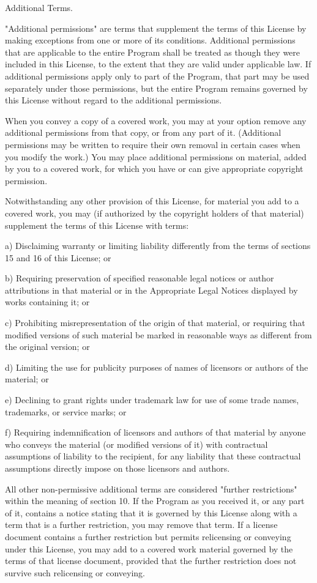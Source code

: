 \begin{DoxyEnumerate}
\item Additional Terms.
\end{DoxyEnumerate}

"{}\+Additional permissions"{} are terms that supplement the terms of this License by making exceptions from one or more of its conditions. Additional permissions that are applicable to the entire Program shall be treated as though they were included in this License, to the extent that they are valid under applicable law. If additional permissions apply only to part of the Program, that part may be used separately under those permissions, but the entire Program remains governed by this License without regard to the additional permissions.

When you convey a copy of a covered work, you may at your option remove any additional permissions from that copy, or from any part of it. (Additional permissions may be written to require their own removal in certain cases when you modify the work.) You may place additional permissions on material, added by you to a covered work, for which you have or can give appropriate copyright permission.

Notwithstanding any other provision of this License, for material you add to a covered work, you may (if authorized by the copyright holders of that material) supplement the terms of this License with terms\+: \begin{DoxyVerb}a) Disclaiming warranty or limiting liability differently from the
terms of sections 15 and 16 of this License; or

b) Requiring preservation of specified reasonable legal notices or
author attributions in that material or in the Appropriate Legal
Notices displayed by works containing it; or

c) Prohibiting misrepresentation of the origin of that material, or
requiring that modified versions of such material be marked in
reasonable ways as different from the original version; or

d) Limiting the use for publicity purposes of names of licensors or
authors of the material; or

e) Declining to grant rights under trademark law for use of some
trade names, trademarks, or service marks; or

f) Requiring indemnification of licensors and authors of that
material by anyone who conveys the material (or modified versions of
it) with contractual assumptions of liability to the recipient, for
any liability that these contractual assumptions directly impose on
those licensors and authors.
\end{DoxyVerb}
 All other non-\/permissive additional terms are considered "{}further restrictions"{} within the meaning of section 10. If the Program as you received it, or any part of it, contains a notice stating that it is governed by this License along with a term that is a further restriction, you may remove that term. If a license document contains a further restriction but permits relicensing or conveying under this License, you may add to a covered work material governed by the terms of that license document, provided that the further restriction does not survive such relicensing or conveying.

